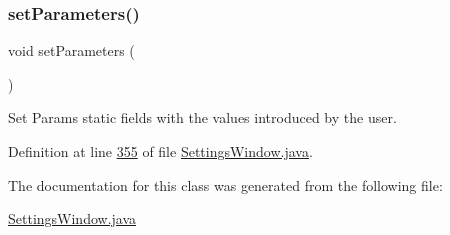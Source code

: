 \subsubsection{\texorpdfstring{set\+Parameters()}{setParameters()}}
{\footnotesize\ttfamily void set\+Parameters (\begin{DoxyParamCaption}{ }\end{DoxyParamCaption})}



Set Params static fields with the values introduced by the user. 



Definition at line \hyperlink{_settings_window_8java_source_l00355}{355} of file \hyperlink{_settings_window_8java_source}{Settings\+Window.\+java}.



The documentation for this class was generated from the following file\+:\begin{DoxyCompactItemize}
\item 
\hyperlink{_settings_window_8java}{Settings\+Window.\+java}\end{DoxyCompactItemize}
